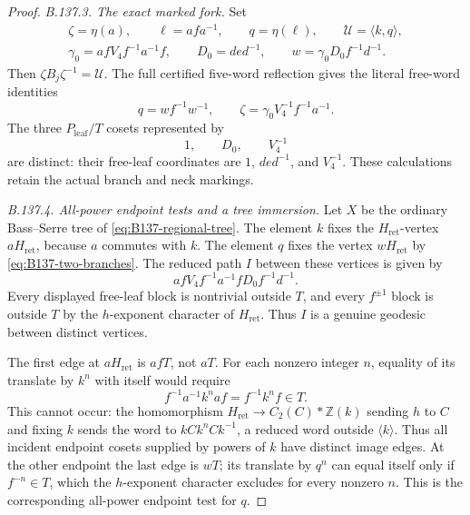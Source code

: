 \begin{proof}
\emph{B.137.3. The exact marked fork.}
Set
\begin{equation}\label{eq:B137-fork-words}
 \begin{gathered}
 \zeta=\eta(a),\qquad \ell=afa^{-1},\qquad q=\eta(\ell),
 \qquad \mathscr U=\langle k,q\rangle,\\
 \gamma_0=afV_4f^{-1}a^{-1}f,\qquad D_0=de d^{-1},\qquad
 w=\gamma_0D_0f^{-1}d^{-1}.
 \end{gathered}
\end{equation}
Then $\zeta B_j\zeta^{-1}=\mathscr U$.
The full certified five-word reflection gives the literal
free-word identities
\begin{equation}\label{eq:B137-two-branches}
 q=wf^{-1}w^{-1},\qquad
 \zeta=\gamma_0V_4^{-1}f^{-1}a^{-1}.
\end{equation}
The three $P_{\mathrm{leaf}}/T$ cosets represented by
\begin{equation}\label{eq:B137-directions}
 1,\qquad D_0,\qquad V_4^{-1}
\end{equation}
are distinct: their free-leaf coordinates are $1$, $de d^{-1}$,
and $V_4^{-1}$. These calculations retain the actual branch
and neck markings.

\emph{B.137.4. All-power endpoint tests and a tree immersion.}
Let $X$ be the ordinary Bass--Serre tree of
\eqref{eq:B137-regional-tree}. The element $k$ fixes the
$H_{\mathrm{ret}}$-vertex $aH_{\mathrm{ret}}$, because $a$
commutes with $k$. The element $q$ fixes the vertex
$wH_{\mathrm{ret}}$ by \eqref{eq:B137-two-branches}.
The reduced path $I$ between these vertices is given by
\[
 afV_4f^{-1}a^{-1}fD_0f^{-1}d^{-1}.
\]
Every displayed free-leaf block is nontrivial outside $T$,
and every $f^{\pm1}$ block is outside $T$ by the $h$-exponent
character of $H_{\mathrm{ret}}$. Thus $I$ is a genuine
geodesic between distinct vertices.

The first edge at $aH_{\mathrm{ret}}$ is $afT$, not $aT$.
For each nonzero integer $n$, equality of its translate by
$k^n$ with itself would require
\[
 f^{-1}a^{-1}k^na f=f^{-1}k^nf\in T.
\]
This cannot occur: the homomorphism
$H_{\mathrm{ret}}\to C_2(C)*\mathbb Z(k)$ sending $h$ to $C$
and fixing $k$ sends the word to $kCk^nCk^{-1}$, a reduced
word outside $\langle k\rangle$. Thus all incident endpoint
cosets supplied by powers of $k$ have distinct image edges.
At the other endpoint the last edge is $wT$; its translate
by $q^n$ can equal itself only if $f^{-n}\in T$, which the
$h$-exponent character excludes for every nonzero $n$.
This is the corresponding all-power endpoint test for $q$.


\end{proof}
